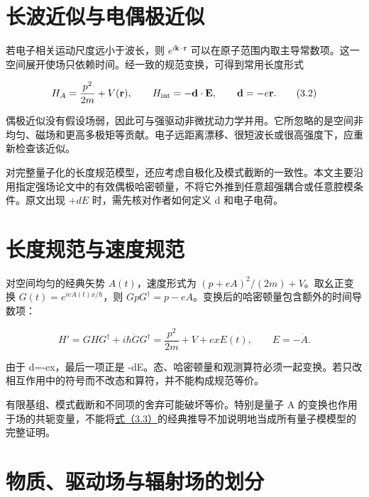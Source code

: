 \documentclass[UTF8,a4paper,zihao=-4,openany,fontset=fandol]{ctexbook}
\begin{document}
\section{长波近似与电偶极近似}\label{sec:03:3}


若电子相关运动尺度远小于波长，则 $e^{i\mathbf k\cdot\mathbf r}$ 可以在原子范围内取主导常数项。这一空间展开使场只依赖时间。经一致的规范变换，可得到常用长度形式



\begin{equation*}
H_A=\frac{p^2}{2m}+V(\mathbf r),\qquad
H_{\rm int}=-\mathbf d\cdot\mathbf E,\qquad
\mathbf d=-e\mathbf r.
\tag{3.2}\label{eq:3.2}
\end{equation*}


偶极近似没有假设场弱，因此可与强驱动非微扰动力学并用。它所忽略的是空间非均匀、磁场和更高多极矩等贡献。电子远距离漂移、很短波长或很高强度下，应重新检查该近似。



对完整量子化的长度规范模型，还应考虑自极化及模式截断的一致性。本文主要沿用指定强场论文中的有效偶极哈密顿量，不将它外推到任意超强耦合或任意腔模条件。原文出现 $+dE$ 时，需先核对作者如何定义 d 和电子电荷。



\section{长度规范与速度规范}\label{sec:03:4}


对空间均匀的经典矢势 $A(t)$，速度形式为 $(p+eA)^2/(2m)+V$。取幺正变换 $G(t)=e^{ieA(t)x/\hbar}$，则 $GpG^\dagger=p-eA$。变换后的哈密顿量包含额外的时间导数项：



\begin{equation*}
H'=GHG^\dagger+i\hbar\dot GG^\dagger
=\frac{p^2}{2m}+V+exE(t),\qquad E=-\dot A.
\tag{3.3}\label{eq:3.3}
\end{equation*}


由于 d=-ex，最后一项正是 -dE。态、哈密顿量和观测算符必须一起变换。若只改相互作用中的符号而不改态和算符，并不能构成规范等价。



有限基组、模式截断和不同项的舍弃可能破坏等价。特别是量子 A 的变换也作用于场的共轭变量，不能将\hyperref[eq:3.3]{式（3.3）}的经典推导不加说明地当成所有量子模模型的完整证明。



\section{物质、驱动场与辐射场的划分}\label{sec:03:5}
\end{document}
